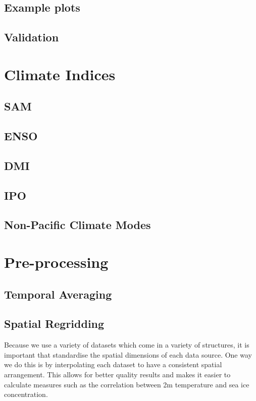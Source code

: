 \documentclass[../main.tex]{subfiles}
\begin{document}
\subsection{Example plots}


\subsection{Validation}




\section{Climate Indices}
\subsection*{SAM}
\subsection*{ENSO}
\subsection*{DMI}
\subsection*{IPO}
\subsection*{Non-Pacific Climate Modes}


\section{Pre-processing}
\subsection*{Temporal Averaging}
\subsection*{Spatial Regridding}
Because we use a variety of datasets which come in a variety of structures, it is important that standardise the spatial dimensions of each data source. One way we do this is by interpolating each dataset to have a consistent spatial arrangement. This allows for better quality results and makes it easier to calculate measures such as the correlation between 2m temperature and sea ice concentration.
\end{document}
